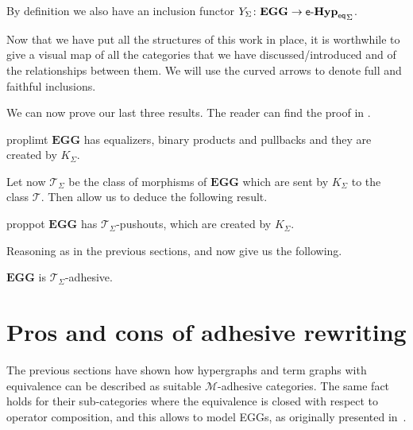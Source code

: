 \documentclass[3p]{elsarticle}
\newcommand{\eq}{\mathsf{eq}}
\newcommand{\eg}[0]{\mathbf{EGG}}
\newcommand{\catname}[1]{\textbf{\textup{#1}}}
\newcommand{\hyp}{\catname{Hyp}}
\newcommand{\EqHyp}{\catname{Hyp}_{\mathsf{eq}}} %
\newcommand{\EqHyps}{\catname{Hyp}_{\mathsf{eq}, \mathcal{G}}}
\newcommand{\EqTG}{\catname{EqTG}}
\newcommand{\tg}[0]{\catname{TG}_{\Sigma}}
\newcommand{\egg}{\mathsf{e}\text{-}\catname{Hyp}_\eq}
\theoremstyle{remark}
\theoremstyle{definition}
\begin{document}
\begin{rem}
	By definition we also have an inclusion functor $Y_\Sigma\colon \eg\to {\egg}_\Sigma$.
\end{rem}

\noindent 
\begin{minipage}[l]{.58\linewidth}
	\begin{rem}
		Now that we have put all the structures of this work in place, it is worthwhile to give a visual map of all the categories that we have discussed/introduced and of the relationships between them. We will use the curved arrows to denote full and faithful inclusions.
	\end{rem}
\end{minipage}\hfill
\iffalse \begin{minipage}[r]{.20\linewidth}
	\xymatrix@R=10pt@C=20pt{\eg \ar@{^{(}->}[r]^-{Y_\Sigma} \ar@{^{(}->}[d]_{K_\Sigma} & \egg_\Sigma \ar@{^{(}->}[d]^{Z_\Sigma} \ar[r]^{W_\Sigma}& \egg \ar@{^{(}->}[d]^{I}\\ \EqTG_{\Sigma} \ar@{^{(}->}[r]^-{J_\Sigma}\ar[d]_{S_\Sigma}& \EqHyps \ar[r]^-{V_\Sigma} \ar[d]_{T_\Sigma}& \EqHyp \ar[d]^{T}\\ \tg \ar@{^{(}->}[r]^-{I_\Sigma}& \hyp_{\Sigma} \ar[r]^-{U_\Sigma}  &\hyp}
\end{minipage}
\fi 
We can now prove our last three results. The reader can find the proof in .

\begin{restatable}{prop}{limt}\label{prop:limt}
	$\eg$ has equalizers, binary products and pullbacks and they are created by $K_\Sigma$.
\end{restatable}

Let now $\mathcal{T}_\Sigma$ be the class of morphisms of $\eg$ which are sent by $K_\Sigma$ to the class $\mathcal{T}$. Then  allow us to deduce the following result.

\begin{restatable}{prop}{pot}\label{prop:pot}
	$\eg$ has $\mathcal{T}_\Sigma$-pushouts, which are created by $K_\Sigma$.
\end{restatable}

Reasoning as in the previous sections,  and  now give us the following. 

\begin{cor}
$\eg$ is $\mathcal{T}_\Sigma$-adhesive.
\end{cor}
\fi 

\section{Pros and cons of adhesive rewriting}
\label{rewriting}
The previous sections have shown how hypergraphs and term graphs with equivalence
can be described as suitable $\mathcal{M}$-adhesive categories. 
The same fact holds for their sub-categories where the equivalence is
 closed with respect to operator composition, and this allows to
 model EGGs, as originally presented in~\cite{WillseyNWFTP21}. 
\end{document}
